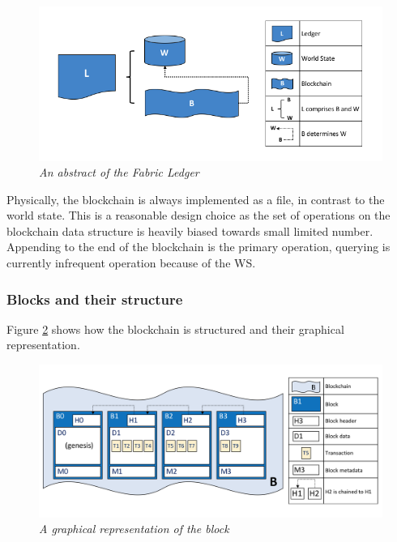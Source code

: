 \documentclass[a4paper,11pt]{report}
\begin{document}
\begin{figure}[h]
\centering
  \includegraphics[width=16cm]{ledgerdiagram1.png}
  \caption{\textit{An abstract of the Fabric Ledger \cite{fabledger}}}
  \label{fabricLedger}
\end{figure}

Physically, the blockchain is always implemented as a file, in contrast to the world state. This is a reasonable design choice as the set of operations on the blockchain data structure is heavily biased towards small limited number. Appending to the end of the blockchain is the primary operation, querying is currently infrequent operation because of the WS. 

\subsubsection{Blocks and their structure}

Figure \ref{fabricBlock} shows how the blockchain is structured and their graphical representation. 

\begin{figure}[h]
\centering
  \includegraphics[width=16cm]{ledgerdiagram2.png}
  \caption{\textit{A graphical representation of the block \cite{fabledger}}}
  \label{fabricBlock}
\end{figure}
\end{document}
